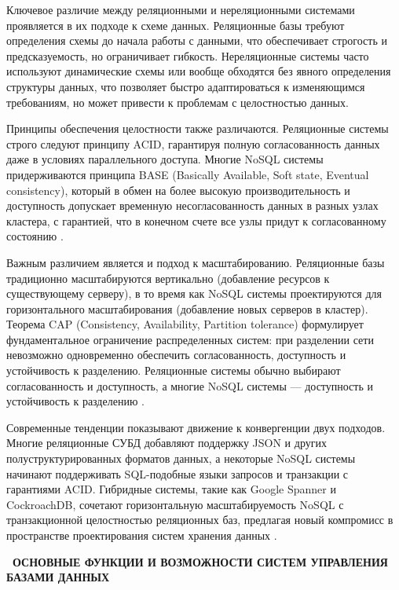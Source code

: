 \documentclass{SibFU-docs}
\begin{document}
Ключевое различие между реляционными и нереляционными системами проявляется в их подходе к схеме данных. Реляционные базы требуют определения схемы до начала работы с данными, что обеспечивает строгость и предсказуемость, но ограничивает гибкость. Нереляционные системы часто используют динамические схемы или вообще обходятся без явного определения структуры данных, что позволяет быстро адаптироваться к изменяющимся требованиям, но может привести к проблемам с целостностью данных.

Принципы обеспечения целостности также различаются. Реляционные системы строго следуют принципу ACID, гарантируя полную согласованность данных даже в условиях параллельного доступа. Многие NoSQL системы придерживаются принципа BASE (Basically Available, Soft state, Eventual consistency), который в обмен на более высокую производительность и доступность допускает временную несогласованность данных в разных узлах кластера, с гарантией, что в конечном счете все узлы придут к согласованному состоянию \cite{ongaro2014}.

Важным различием является и подход к масштабированию. Реляционные базы традиционно масштабируются вертикально (добавление ресурсов к существующему серверу), в то время как NoSQL системы проектируются для горизонтального масштабирования (добавление новых серверов в кластер). Теорема CAP (Consistency, Availability, Partition tolerance) формулирует фундаментальное ограничение распределенных систем: при разделении сети невозможно одновременно обеспечить согласованность, доступность и устойчивость к разделению. Реляционные системы обычно выбирают согласованность и доступность, а многие NoSQL системы — доступность и устойчивость к разделению \cite{ongaro2014}.

Современные тенденции показывают движение к конвергенции двух подходов. Многие реляционные СУБД добавляют поддержку JSON и других полуструктурированных форматов данных, а некоторые NoSQL системы начинают поддерживать SQL-подобные языки запросов и транзакции с гарантиями ACID. Гибридные системы, такие как Google Spanner и CockroachDB, сочетают горизонтальную масштабируемость NoSQL с транзакционной целостностью реляционных баз, предлагая новый компромисс в пространстве проектирования систем хранения данных \cite{corbett2012}.

\newpage
{}
\begin{center}\textbf{\thesection\ ОСНОВНЫЕ ФУНКЦИИ И ВОЗМОЖНОСТИ СИСТЕМ УПРАВЛЕНИЯ БАЗАМИ ДАННЫХ}\end{center}
\vspace*{-1.5em}
\end{document}
